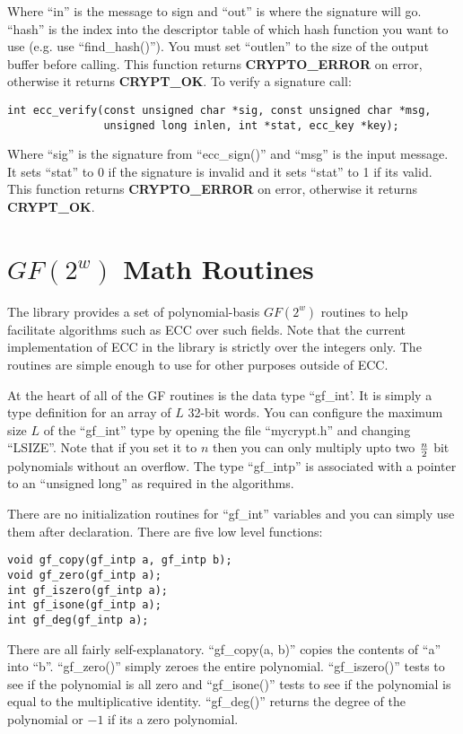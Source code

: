 \documentclass{book}
\begin{document}
Where ``in'' is the message to sign and ``out'' is where the signature will go.  ``hash'' is the index into the descriptor
table of which hash function you want to use (e.g. use ``find\_hash()'').  You must set ``outlen'' to the size of the 
output buffer before calling.  This function returns {\bf CRYPTO\_ERROR} on error, otherwise it returns {\bf CRYPT\_OK}.  To
verify a signature call:
\begin{verbatim}
int ecc_verify(const unsigned char *sig, const unsigned char *msg, 
               unsigned long inlen, int *stat, ecc_key *key);
\end{verbatim}
Where ``sig'' is the signature from ``ecc\_sign()'' and ``msg'' is the input message.  It sets ``stat'' to 0 if the signature
is invalid and it sets ``stat'' to 1 if its valid.  This function returns {\bf CRYPTO\_ERROR} on error, otherwise it returns {\bf CRYPT\_OK}.

\chapter{$GF(2^w)$ Math Routines}

The library provides a set of polynomial-basis $GF(2^w)$ routines to help facilitate algorithms such as ECC over such
fields.  Note that the current implementation of ECC in the library is strictly over the integers only.  The routines
are simple enough to use for other purposes outside of ECC.  

At the heart of all of the GF routines is the data type ``gf\_int'.  It is simply a type definition for an array of 
$L$ 32-bit words.  You can configure the maximum size $L$ of the ``gf\_int'' type by opening the file ``mycrypt.h'' and 
changing ``LSIZE''.  Note that if you set it to $n$ then you can only multiply upto two $n \over 2$ bit polynomials without
an overflow.  The type ``gf\_intp'' is associated with a pointer to an ``unsigned long'' as required in the algorithms.

There are no initialization routines for ``gf\_int'' variables and you can simply use them after declaration.  There are five
low level functions:
    
\begin{verbatim}
void gf_copy(gf_intp a, gf_intp b);
void gf_zero(gf_intp a);
int gf_iszero(gf_intp a);
int gf_isone(gf_intp a);
int gf_deg(gf_intp a);
\end{verbatim}
There are all fairly self-explanatory.  ``gf\_copy(a, b)'' copies the contents of ``a'' into ``b''.  ``gf\_zero()'' simply
zeroes the entire polynomial.  ``gf\_iszero()'' tests to see if the polynomial is all zero and ``gf\_isone()'' tests to see
if the polynomial is equal to the multiplicative identity.  ``gf\_deg()'' returns the degree of the polynomial or $-1$ if its
a zero polynomial.
\end{document}
